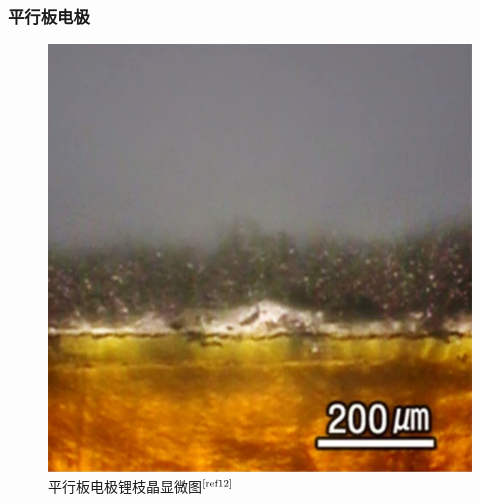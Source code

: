 \documentclass{article}
\begin{document}
\subsubsection{平行板电极}
\begin{figure}[H]
      \centering
       \begin{minipage}{0.32\textwidth}
                    \centering
                    \includegraphics[scale=0.55]{figs/6.png}
                    \caption{平行板电极锂枝晶显微图$^{\textup{\cite{ref12}}}$}
                   

\end{minipage}
\end{figure}
\end{document}
